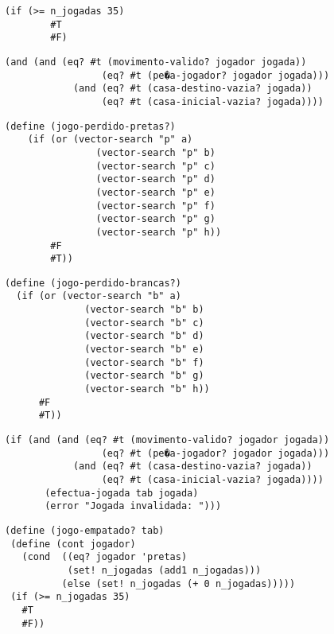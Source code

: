 \begin{lstlisting}[basicstyle=\ttfamily, caption="example"]
  (if (>= n_jogadas 35)
        #T
        #F)
\end{lstlisting}

\begin{lstlisting}[basicstyle=\ttfamily, caption="example"]
(and (and (eq? #t (movimento-valido? jogador jogada))
                 (eq? #t (pe�a-jogador? jogador jogada)))
            (and (eq? #t (casa-destino-vazia? jogada))
                 (eq? #t (casa-inicial-vazia? jogada))))
\end{lstlisting}

\begin{lstlisting}[basicstyle=\ttfamily, caption="example"]
(define (jogo-perdido-pretas?)
    (if (or (vector-search "p" a)
                (vector-search "p" b)
                (vector-search "p" c)
                (vector-search "p" d)
                (vector-search "p" e)
                (vector-search "p" f)
                (vector-search "p" g)
                (vector-search "p" h))
        #F
        #T))
\end{lstlisting}
\begin{lstlisting}[basicstyle=\ttfamily, caption="example"]
(define (jogo-perdido-brancas?)
  (if (or (vector-search "b" a)
              (vector-search "b" b)
              (vector-search "b" c)
              (vector-search "b" d)
              (vector-search "b" e)
              (vector-search "b" f)
              (vector-search "b" g)
              (vector-search "b" h))
      #F
      #T))
\end{lstlisting}
\begin{lstlisting}[basicstyle=\ttfamily, caption="example"]
(if (and (and (eq? #t (movimento-valido? jogador jogada))
                 (eq? #t (pe�a-jogador? jogador jogada)))
            (and (eq? #t (casa-destino-vazia? jogada))
                 (eq? #t (casa-inicial-vazia? jogada))))
       (efectua-jogada tab jogada)
       (error "Jogada invalidada: ")))
\end{lstlisting}
\begin{lstlisting}[basicstyle=\ttfamily, caption="example"]
(define (jogo-empatado? tab)
 (define (cont jogador)
   (cond  ((eq? jogador 'pretas)
           (set! n_jogadas (add1 n_jogadas)))
          (else (set! n_jogadas (+ 0 n_jogadas)))))
 (if (>= n_jogadas 35)
   #T
   #F))
\end{lstlisting}
